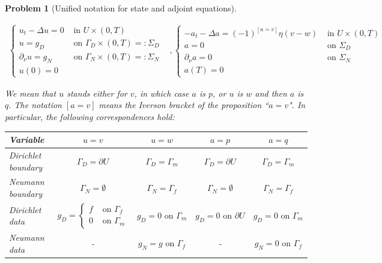 \documentclass[english,a4paper,10pt,oneside]{scrbook}	%
\theoremstyle{break}
\newtheorem{pb}[equation]{Problem}
\theoremstyle{remark}
\begin{document}
\begin{pb}[Unified notation for state and adjoint equations]
\label{pb:uni_state_adj}

\[
\begin{matrix}
\left\{\begin{matrix}
u_t-\Delta u =0 & \text{ in } U\times (0,T)\\ 
u = g_D & \text{ on } \Gamma_D\times(0,T)=:\Sigma_D\\ 
\partial_\nu u = g_N & \text{ on } \Gamma_N\times(0,T)=:\Sigma_N\\ 
u(0) =0 & 
\end{matrix}\right.

&,

\left\{\begin{matrix}
-a_t-\Delta a =(-1)^{\left [a=v\right ]}\eta (v-w) & \text{ in } U\times (0,T)\\ 
a = 0 & \text{ on } \Sigma_D\\ 
\partial_\nu a = 0 & \text{ on } \Sigma_N\\ 
a(T) =0 & 
\end{matrix}\right.
\end{matrix}
\]

We mean that $u$ stands either for $v$, in which case $a$ is $p$, or $u$ is $w$ and then $a$ is $q$. The notation $[a=v]$ means the Iverson bracket of the proposition ``$a=v$". In particular, the following correspondences hold:

\centering
\begin{tabular}{|l|c|c|c|c|} 
\hline
Variable           & $u=v$                                                                                      & $u=w$                          & $a = p$                          & $a=q$                           \\ 
\hline
Dirichlet boundary & $\Gamma_D = \partial U$                                                                    & $\Gamma_D=\Gamma_m$            & $\Gamma_D = \partial U$          & $\Gamma_D = \Gamma_m$           \\ 
\hline
Neumann boundary   & $\Gamma_N = \emptyset$                                                                     & $\Gamma_N = \Gamma_f$          & $\Gamma_N = \emptyset$           & $\Gamma_N = \Gamma_f$           \\
\hline
Dirichlet data     & $g_D=\left\{\begin{matrix}f&\text{ on }\Gamma_f\\0&\text{ on }\Gamma_m\end{matrix}\right.$ & $g_D = 0 \text{ on } \Gamma_m$ & $g_D = 0 \text{ on } \partial U$ & $g_D = 0 \text{ on } \Gamma_m$  \\ 
\hline
Neumann data       & -                              & $g_N = g \text{ on } \Gamma_f$ & -                                & $g_N = 0 \text{ on } \Gamma_f$ \\
\hline
\end{tabular}


\end{pb}
\end{document}
